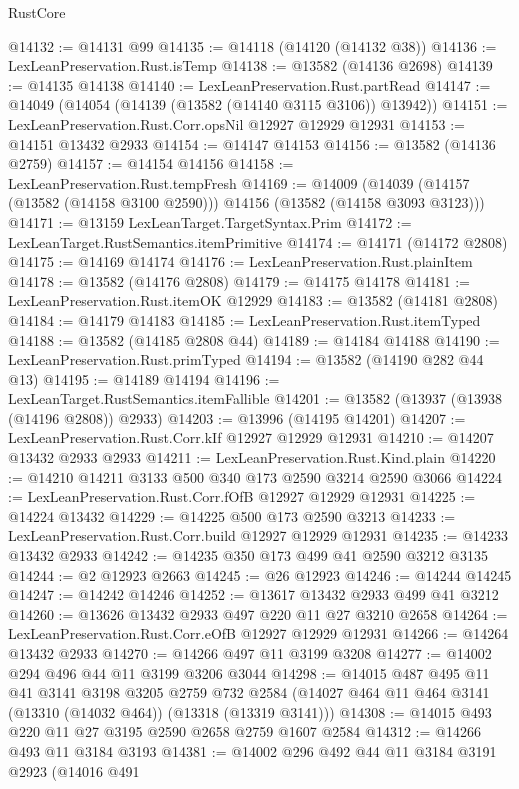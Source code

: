 \begin{lexlean}{RustCore}
\begin{coremodule}
@14132 := @14131 @99
@14135 := @14118 (@14120 (@14132 @38))
@14136 := LexLeanPreservation.Rust.isTemp
@14138 := @13582 (@14136 @2698)
@14139 := @14135 @14138
@14140 := LexLeanPreservation.Rust.partRead
@14147 := @14049 (@14054 (@14139 (@13582 (@14140 @3115 @3106)) @13942))
@14151 := LexLeanPreservation.Rust.Corr.opsNil @12927 @12929 @12931
@14153 := @14151 @13432 @2933
@14154 := @14147 @14153
@14156 := @13582 (@14136 @2759)
@14157 := @14154 @14156
@14158 := LexLeanPreservation.Rust.tempFresh
@14169 := @14009
    (@14039 (@14157 (@13582 (@14158 @3100 @2590))) @14156 (@13582 (@14158 @3093 @3123)))
@14171 := @13159 LexLeanTarget.TargetSyntax.Prim
@14172 := LexLeanTarget.RustSemantics.itemPrimitive
@14174 := @14171 (@14172 @2808)
@14175 := @14169 @14174
@14176 := LexLeanPreservation.Rust.plainItem
@14178 := @13582 (@14176 @2808)
@14179 := @14175 @14178
@14181 := LexLeanPreservation.Rust.itemOK @12929
@14183 := @13582 (@14181 @2808)
@14184 := @14179 @14183
@14185 := LexLeanPreservation.Rust.itemTyped
@14188 := @13582 (@14185 @2808 @44)
@14189 := @14184 @14188
@14190 := LexLeanPreservation.Rust.primTyped
@14194 := @13582 (@14190 @282 @44 @13)
@14195 := @14189 @14194
@14196 := LexLeanTarget.RustSemantics.itemFallible
@14201 := @13582 (@13937 (@13938 (@14196 @2808)) @2933)
@14203 := @13996 (@14195 @14201)
@14207 := LexLeanPreservation.Rust.Corr.kIf @12927 @12929 @12931
@14210 := @14207 @13432 @2933 @2933
@14211 := LexLeanPreservation.Rust.Kind.plain
@14220 := @14210 @14211 @3133 @500 @340 @173 @2590 @3214 @2590 @3066
@14224 := LexLeanPreservation.Rust.Corr.fOfB @12927 @12929 @12931
@14225 := @14224 @13432
@14229 := @14225 @500 @173 @2590 @3213
@14233 := LexLeanPreservation.Rust.Corr.build @12927 @12929 @12931
@14235 := @14233 @13432 @2933
@14242 := @14235 @350 @173 @499 @41 @2590 @3212 @3135
@14244 := @2 @12923 @2663
@14245 := @26 @12923
@14246 := @14244 @14245
@14247 := @14242 @14246
@14252 := @13617 @13432 @2933 @499 @41 @3212
@14260 := @13626 @13432 @2933 @497 @220 @11 @27 @3210 @2658
@14264 := LexLeanPreservation.Rust.Corr.eOfB @12927 @12929 @12931
@14266 := @14264 @13432 @2933
@14270 := @14266 @497 @11 @3199 @3208
@14277 := @14002 @294 @496 @44 @11 @3199 @3206 @3044
@14298 := @14015
    @487
    @495
    @11
    @41
    @3141
    @3198
    @3205
    @2759
    @732
    @2584
    (@14027 @464 @11 @464 @3141 (@13310 (@14032 @464)) (@13318 (@13319 @3141)))
@14308 := @14015 @493 @220 @11 @27 @3195 @2590 @2658 @2759 @1607 @2584
@14312 := @14266 @493 @11 @3184 @3193
@14381 := @14002
    @296
    @492
    @44
    @11
    @3184
    @3191
    @2923
    (@14016
      @491

\end{coremodule}
\end{lexlean}

